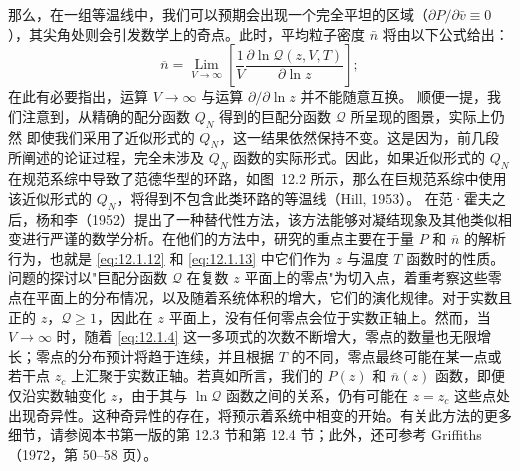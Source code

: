 那么，在一组等温线中，我们可以预期会出现一个完全平坦的区域（\(\partial P/\partial \bar{v} \equiv 0\)），其尖角处则会引发数学上的奇点。此时，平均粒子密度 \(\bar{n}\) 将由以下公式给出：
\begin{equation}\tag{12.1.13}\label{eq:12.1.13}
\overline { { n } } = \operatorname* { L i m } _ { V \rightarrow \infty } \left[ \frac { 1 } { V } \frac { \partial \ln \mathcal { Q } ( z , V , T ) } { \partial \ln z } \right] ;
\end{equation}
在此有必要指出，运算 \(V \to \infty\) 与运算 \(\partial/\partial \ln z\) 并不能随意互换。
顺便一提，我们注意到，从精确的配分函数 \(Q_{N}\) 得到的巨配分函数 \(\mathcal{Q}\) 所呈现的图景，实际上仍然
即使我们采用了近似形式的 \(Q_{N}\)，这一结果依然保持不变。这是因为，前几段所阐述的论证过程，完全未涉及 \(Q_{N}\) 函数的实际形式。因此，如果近似形式的 \(Q_{N}\) 在规范系综中导致了范德华型的环路，如图~12.2 所示，那么在巨规范系综中使用该近似形式的 \(Q_{N}\)，将得到不包含此类环路的等温线（Hill, 1953）。
在范·霍夫之后，杨和李（1952）提出了一种替代性方法，该方法能够对凝结现象及其他类似相变进行严谨的数学分析。在他们的方法中，研究的重点主要在于量 \(P\) 和 \(\overline{n}\) 的解析行为，也就是 \autoref{eq:12.1.12} 和 \autoref{eq:12.1.13} 中它们作为 \(z\) 与温度 \(T\) 函数时的性质。问题的探讨以"巨配分函数 \(\mathcal{Q}\) 在复数 \(z\) 平面上的零点"为切入点，着重考察这些零点在平面上的分布情况，以及随着系统体积的增大，它们的演化规律。对于实数且正的 \(z\)，\(\mathcal{Q} \geq 1\)，因此在 \(z\) 平面上，没有任何零点会位于实数正轴上。然而，当 \(V \to \infty\) 时，随着 \autoref{eq:12.1.4} 这一多项式的次数不断增大，零点的数量也无限增长；零点的分布预计将趋于连续，并且根据 \(T\) 的不同，零点最终可能在某一点或若干点 \(z_c\) 上汇聚于实数正轴。若真如所言，我们的 \(P(z)\) 和 \(\overline{n}(z)\) 函数，即便仅沿实数轴变化 \(z\)，由于其与 \(\ln \mathcal{Q}\) 函数之间的关系，仍有可能在 \(z = z_c\) 这些点处出现奇异性。这种奇异性的存在，将预示着系统中相变的开始。有关此方法的更多细节，请参阅本书第一版的第 12.3 节和第 12.4 节；此外，还可参考 Griffiths（1972，第 50--58 页）。
